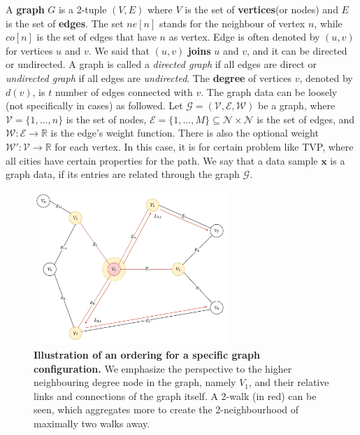 \documentclass{article}
\begin{document}
A \textbf{graph} $G$ is a 2-tuple $(V,E)$ where $V$ is the set of \textbf{vertices}(or nodes) and $E$ is the set of \textbf{edges}. The set $ne[n]$ stands for the neighbour of vertex $n$, while $co[n]$ is the set of edges that have $n$ as vertex. Edge is often denoted by $(u,v)$ for vertices $u$ and $v$. We said that $(u,v)$ \textbf{joins} $u$ and $v$, and it can be directed or undirected. A graph is called a \textit{directed graph} if all edges are direct or \textit{undirected graph} if all edges are \textit{undirected}. The \textbf{degree} of vertices $v$, denoted by $d(v)$, is $t$ number of edges connected with $v$.
The graph data can be loosely (not specifically in cases) as followed. Let $\mathcal{G}=(\mathcal{V},\mathcal{E},\mathcal{W})$ be a graph, where $\mathcal{V}=\{1,\dots,n\}$ is the set of nodes, $\mathcal{E}=\{1,\dots,M\}\subseteq \mathcal{N}\times \mathcal{N}$ is the set of edges, and $\mathcal{W}: \mathcal{E}\to \mathbb{R}$ is the edge's weight function. There is also the optional weight $\mathcal{W}': \mathcal{V}\to \mathbb{R}$ for each vertex. In this case, it is for certain problem like TVP, where all cities have certain properties for the path. We say that a data sample $\mathbf{x}$ is a graph data, if its entries are related through the graph $\mathcal{G}$. 

\begin{figure}[htb]
  \centering
  \includegraphics[width=0.65\textwidth]{graph_tech.png}
  \caption{
    \textbf{Illustration of an ordering for a specific graph configuration.} We emphasize the perspective to the higher neighbouring degree node in the graph, namely $V_{1}$, and their relative links and connections of the graph itself. A 2-walk (in red) can be seen, which aggregates more to create the 2-neighbourhood of maximally two walks away. 
  }
\end{figure}
\end{document}
